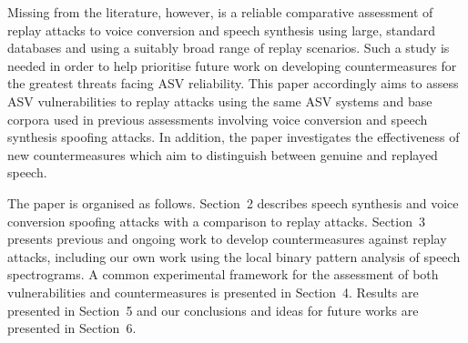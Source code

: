 Missing from the literature, however, is a reliable comparative assessment 
of replay attacks to voice conversion and speech synthesis using large, 
standard databases and using a suitably broad range of replay scenarios. 
Such a study is needed in order to help prioritise future work on developing
countermeasures for the greatest threats facing ASV reliability.
This paper accordingly aims to assess ASV vulnerabilities 
to replay attacks using the same ASV systems and base corpora used in 
previous assessments involving voice conversion and speech synthesis 
spoofing attacks.  In addition, the paper investigates the effectiveness of 
new countermeasures which aim to distinguish between genuine and replayed speech.  

The paper is organised as follows.  Section~2 describes speech synthesis and voice conversion spoofing attacks with a comparison to replay attacks. Section~3 presents previous and ongoing work to develop countermeasures against replay attacks, including our own work using the local binary pattern analysis of speech spectrograms.  A common experimental framework for the assessment of both vulnerabilities and countermeasures is presented in Section~4. Results are presented in Section~5 and our conclusions and ideas for future works are presented in Section~6.
